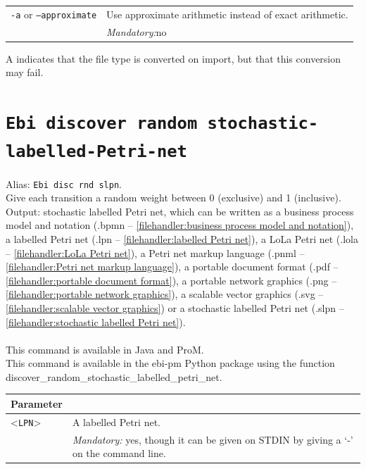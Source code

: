 {\begin{tabularx}{\linewidth}{lX}
\texttt{-a} or \texttt{--approximate} & Use approximate arithmetic instead of exact arithmetic.\\
&\textit{Mandatory:}\quad no\\
\bottomrule
\end{tabularx}
A \textdagger{} indicates that the file type is converted on import, but that this conversion may fail.
\clearpage\section{\texttt{Ebi discover random stochastic-labelled-Petri-net}}
\label{command:Ebi discover random stochastic-labelled-Petri-net}
Alias: \texttt{Ebi disc rnd slpn}.\\
Give each transition a random weight between 0 (exclusive) and 1 (inclusive).\\
\noindent Output: stochastic labelled Petri net, which can be written as a business process model and notation (.bpmn -- \cref{filehandler:business process model and notation}), a labelled Petri net (.lpn -- \cref{filehandler:labelled Petri net}), a LoLa Petri net (.lola -- \cref{filehandler:LoLa Petri net}), a Petri net markup language (.pnml -- \cref{filehandler:Petri net markup language}), a portable document format (.pdf -- \cref{filehandler:portable document format}), a portable network graphics (.png -- \cref{filehandler:portable network graphics}), a scalable vector graphics (.svg -- \cref{filehandler:scalable vector graphics}) or a stochastic labelled Petri net (.slpn -- \cref{filehandler:stochastic labelled Petri net}).\\
\\This command is available in Java and ProM.
\\This command is available in the ebi-pm Python package using the function discover\_random\_stochastic\_labelled\_petri\_net.
\begin{tabularx}{\linewidth}{lX}
\toprule
Parameter \\\midrule
<\texttt{LPN}>&A labelled Petri net.\\
&\textit{Mandatory:} \quad yes, though it can be given on STDIN by giving a `-' on the command line.\\

\end{tabularx}}

